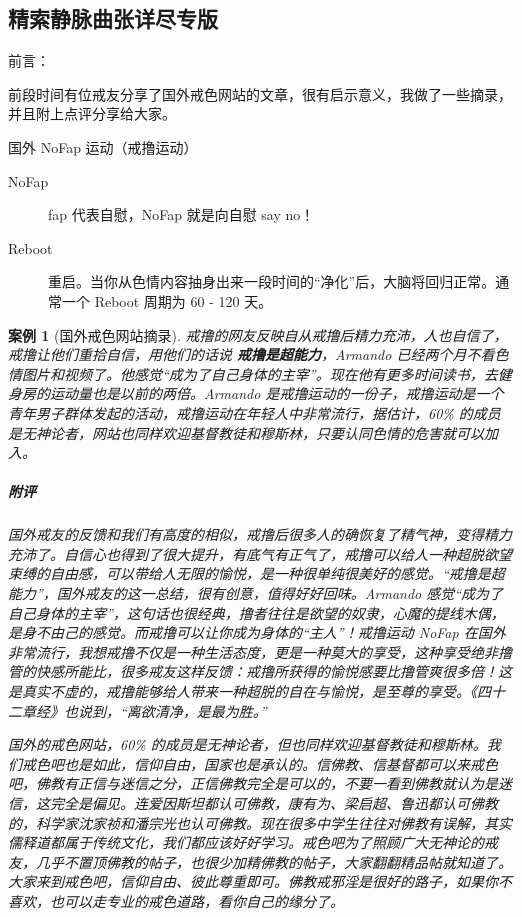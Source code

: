 \documentclass{ctexart}
\newtheorem{case}{案例}
\begin{document}
\subsection{精索静脉曲张详尽专版}

前言：

前段时间有位戒友分享了国外戒色网站的文章，很有启示意义，我做了一些摘录，并且附上点评分享给大家。

国外 NoFap 运动（戒撸运动）

\begin{description}
    \item[NoFap] fap 代表自慰，NoFap 就是向自慰 say no！
    \item[Reboot] 重启。当你从色情内容抽身出来一段时间的“净化”后，大脑将回归正常。通常一个 Reboot 周期为 60 - 120 天。
\end{description}

\begin{case}[国外戒色网站摘录]
    戒撸的网友反映自从戒撸后精力充沛，人也自信了，戒撸让他们重拾自信，用他们的话说 \textbf{戒撸是超能力}，Armando 已经两个月不看色情图片和视频了。他感觉“成为了自己身体的主宰”。现在他有更多时间读书，去健身房的运动量也是以前的两倍。Armando 是戒撸运动的一份子，戒撸运动是一个青年男子群体发起的活动，戒撸运动在年轻人中非常流行，据估计，60\% 的成员是无神论者，网站也同样欢迎基督教徒和穆斯林，只要认同色情的危害就可以加入。
    \subparagraph{附评} 国外戒友的反馈和我们有高度的相似，戒撸后很多人的确恢复了精气神，变得精力充沛了。自信心也得到了很大提升，有底气有正气了，戒撸可以给人一种超脱欲望束缚的自由感，可以带给人无限的愉悦，是一种很单纯很美好的感觉。“戒撸是超能力”，国外戒友的这一总结，很有创意，值得好好回味。Armando 感觉“成为了自己身体的主宰”，这句话也很经典，撸者往往是欲望的奴隶，心魔的提线木偶，是身不由己的感觉。而戒撸可以让你成为身体的“主人”！戒撸运动 NoFap 在国外非常流行，我想戒撸不仅是一种生活态度，更是一种莫大的享受，这种享受绝非撸管的快感所能比，很多戒友这样反馈：戒撸所获得的愉悦感要比撸管爽很多倍！这是真实不虚的，戒撸能够给人带来一种超脱的自在与愉悦，是至尊的享受。《四十二章经》也说到，“离欲清净，是最为胜。”

    国外的戒色网站，60\% 的成员是无神论者，但也同样欢迎基督教徒和穆斯林。我们戒色吧也是如此，信仰自由，国家也是承认的。信佛教、信基督都可以来戒色吧，佛教有正信与迷信之分，正信佛教完全是可以的，不要一看到佛教就认为是迷信，这完全是偏见。连爱因斯坦都认可佛教，康有为、梁启超、鲁迅都认可佛教的，科学家沈家祯和潘宗光也认可佛教。现在很多中学生往往对佛教有误解，其实儒释道都属于传统文化，我们都应该好好学习。戒色吧为了照顾广大无神论的戒友，几乎不置顶佛教的帖子，也很少加精佛教的帖子，大家翻翻精品帖就知道了。大家来到戒色吧，信仰自由、彼此尊重即可。佛教戒邪淫是很好的路子，如果你不喜欢，也可以走专业的戒色道路，看你自己的缘分了。
\end{case}
\end{document}
